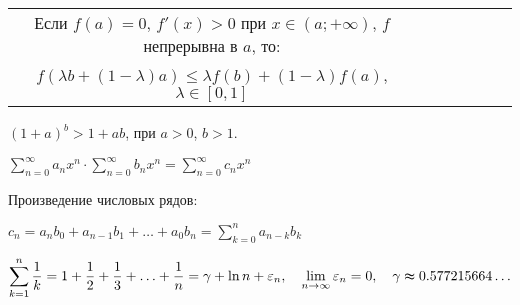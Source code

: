 \begin{tabu}[t]{ccccccc}
	Если $f(a) = 0$, $f'(x)>0$ при $x \in (a; +\infty)$, $f$ непрерывна в $a$, то: \\
	$f(\lambda b + (1-\lambda)a) \leqslant \lambda f(b) + (1-\lambda) f(a)$, $\lambda \in [0, 1]$
\end{tabu}

$\displaystyle (1+a)^b > 1 + ab $, при $a > 0$, $ b > 1 $.

$\displaystyle \sum_{n=0}^{\infty} a_n x^n \cdot \sum_{n=0}^{\infty} b_n x^n = \sum_{n=0}^{\infty} c_n x^n $

Произведение числовых рядов:

$\displaystyle c_n = a_n b_0 + a_{n-1} b_1 + \ldots + a_0 b_n = \sum_{k=0}^{n} a_{n-k} b_k $

$\displaystyle \sum^{n}_{k=1} \frac{1}{k} = 1 + \frac12 + \frac13 + \ldots + \frac{1}{n} = \gamma + \ln n + \varepsilon_n, \quad \lim_{n\to \infty} \varepsilon_n = 0, \quad \gamma \thickapprox 0.577215664 \ldots $


